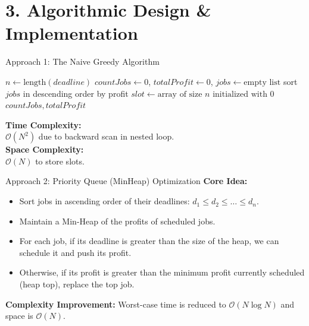 \documentclass[aspectratio=169]{beamer}
\begin{document}
\section{3. Algorithmic Design \& Implementation}

\begin{frame}{Approach 1: The Naive Greedy Algorithm}
    \begin{minipage}[t]{0.64\textwidth}
        \begin{algorithm}[H]
        \scriptsize
        \caption{Naive Greedy}
        \SetAlgoLined
        $n \leftarrow \text{length}(deadline)$\;
        $countJobs \leftarrow 0$, $totalProfit \leftarrow 0$, $jobs \leftarrow \text{empty list}$\;
        sort $jobs$ in descending order by profit\;
        $slot \leftarrow \text{array of size } n \text{ initialized with } 0$\;
        \Return $countJobs, totalProfit$\;
        \end{algorithm}
    \end{minipage}
    \hfill
    \begin{minipage}[t]{0.33\textwidth}
        \vspace{0.4cm}
        \small
        \textbf{Time Complexity:} \\ $\mathcal{O}(N^2)$ due to backward scan in nested loop. \\
        \vspace{0.5cm}
        \textbf{Space Complexity:} \\ $\mathcal{O}(N)$ to store slots.
    \end{minipage}
\end{frame}

\begin{frame}{Approach 2: Priority Queue (MinHeap) Optimization}
    \textbf{Core Idea:}
    \begin{itemize}
        \item Sort jobs in ascending order of their deadlines: $d_1 \le d_2 \le \dots \le d_n$.
        \item Maintain a Min-Heap of the profits of scheduled jobs.
        \item For each job, if its deadline is greater than the size of the heap, we can schedule it and push its profit.
        \item Otherwise, if its profit is greater than the minimum profit currently scheduled (heap top), replace the top job.
    \end{itemize}
    \vspace{0.3cm}
    \textbf{Complexity Improvement:} Worst-case time is reduced to $\mathcal{O}(N \log N)$ and space is $\mathcal{O}(N)$.
\end{frame}
\end{document}
